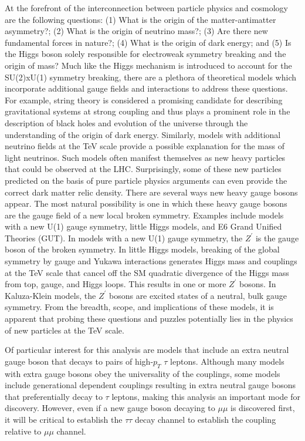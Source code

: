 At the forefront of the interconnection between particle physics and cosmology are the following questions: (1) What is the origin of the matter-antimatter 
asymmetry?; (2) What is the origin of neutrino mass?; (3) Are there new fundamental forces in nature?; (4) What is the origin of dark energy; and (5) Is the Higgs 
boson solely responsible for electroweak symmetry breaking and the origin of mass? Much like the Higgs mechanism is introduced to account for the SU(2)xU(1) 
symmetry breaking, there are a plethora of theoretical models which incorporate additional gauge fields and interactions to address these questions. For example, 
string theory is considered a promising candidate for describing gravitational systems at strong coupling and thus plays a prominent role in the description of 
black holes and evolution of the universe through the understanding of the origin of dark energy. Similarly, models with additional neutrino fields at the TeV 
scale provide a possible explanation for the mass of light neutrinos. Such models often manifest themselves as new heavy particles that could be observed at the 
LHC. Surprisingly, some of these new particles predicted on the basis of pure particle physics arguments can even provide the correct dark matter relic density. 
There are several ways new heavy gauge bosons appear. The most natural possibility is one in which these heavy gauge bosons are the gauge field of a new 
local broken symmetry. Examples include models with a new U(1) gauge symmetry, little Higgs models, and E6 Grand Unified Theories (GUT). 
In models with a new U(1) gauge symmetry, the $Z^\prime$ is the gauge boson of the broken symmetry. In
little Higgs models, breaking of the global symmetry by gauge and Yukawa interactions generates Higgs mass and couplings at the TeV scale that cancel off the SM
quadratic divergence of the Higgs mass from top, gauge, and Higgs loops. This results in one or more $Z^\prime$ bosons. In Kaluza-Klein models, the $Z^\prime$
bosons are excited states of a neutral, bulk gauge symmetry.
From the breadth, scope, and implications of these models, it is apparent that probing these questions and puzzles potentially lies in the physics of new
particles at the TeV scale. 

Of particular interest for this analysis are models that include an extra neutral gauge boson that decays to pairs of high-$p_{T}$ $\tau$ leptons. Although 
many models with extra gauge bosons obey the universality of the couplings, some models include generational dependent couplings resulting in extra neutral gauge 
bosons that preferentially decay to $\tau$ leptons, making this analysis an important mode for discovery. However, even if a new gauge boson decaying to $\mu\mu$ 
is discovered first, it will be critical to establish the $\tau\tau$ decay channel to establish the coupling relative to $\mu\mu$ channel.
